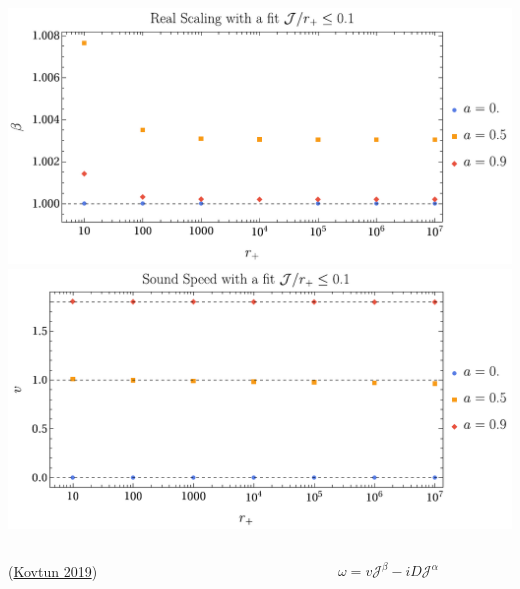 \documentclass[xcolor=dvipsnames]{beamer}
\begin{document}
\begin{frame}
\begin{columns}[c]
    \begin{column}{0.5\textwidth}
      \includegraphics[width=1.05\textwidth]{figs/vector_dispersive_mode_rp_vs_re_scaling_over_a_scaled_Jleq0_1.pdf}\\
      \includegraphics[width=1.05\textwidth]{figs/vector_dispersive_mode_rp_vs_soundspeed_over_a_scaled_Jleq0_1.pdf}
    \end{column}
  \end{columns}

  \vfill

  \begin{columns}[c]
    \begin{column}{0.5\textwidth}
      (\href{https://inspirehep.net/literature/1744607}{Kovtun 2019})
    \end{column}

    \begin{column}{0.5\textwidth}
      \begin{equation}
        \omega = v \mathcal J^\beta - i D \mathcal J^\alpha
      \end{equation}
    \end{column}
  \end{columns}
\end{frame}
\end{document}
